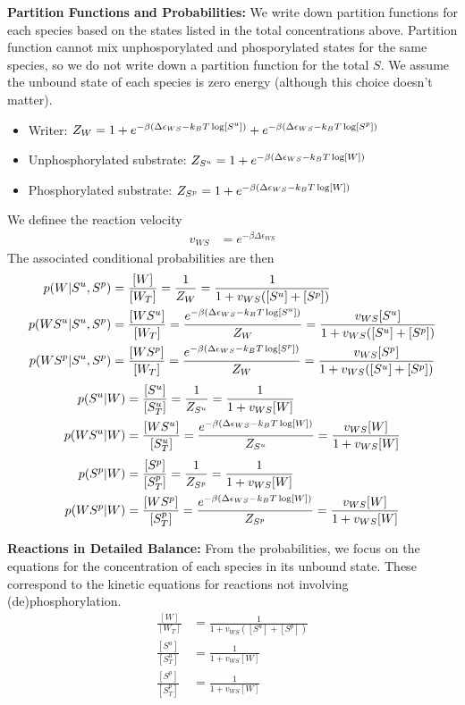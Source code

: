 \documentclass[aps,onecolumn,superscriptaddress,notitlepage]{revtex4-1}
\begin{document}
\textbf{Partition Functions and Probabilities:}
We write down partition functions for each species based on the states listed in the total concentrations above. 
Partition function cannot mix unphosporylated and phosporylated states for the same species, 
so we do not write down a partition function for the total $S$.
We assume the unbound state of each species is zero energy (although this choice doesn't matter).
\begin{itemize}
\item Writer: $Z_W = 1 + e^{-\beta\qty(\Delta\epsilon_{WS} -k_BT \log[S^u])} + e^{-\beta(\Delta\epsilon_{WS} -k_BT \log[S^p])}$
\item Unphosphorylated substrate: $Z_{S^u} = 1 + e^{-\beta\qty(\Delta\epsilon_{WS} -k_BT \log[W])}$
\item Phosphorylated substrate: $Z_{S^p} = 1 + e^{-\beta\qty(\Delta\epsilon_{WS} -k_BT \log[W])}$
\end{itemize}
We definee the reaction velocity
\begin{align}
v_{WS} &= e^{-\beta\Delta\epsilon_{WS}}
\end{align}
The associated conditional probabilities are then
\begin{align}
p(W|S^u,S^p) &= \frac{[W]}{[W_T]} = \frac{1}{Z_W} =  \frac{1}{1 + v_{WS}([S^u] +[S^p])}\\
p(WS^u|S^u,S^p) &= \frac{[WS^u]}{[W_T]}  = \frac{e^{-\beta\qty(\Delta\epsilon_{WS} -k_BT \log[S^u])}}{Z_W} =  \frac{v_{WS}[S^u]}{1 + v_{WS}([S^u] +[S^p])}\\
p(WS^p|S^u,S^p) &= \frac{[WS^p]}{[W_T]}  = \frac{e^{-\beta\qty(\Delta\epsilon_{WS} -k_BT \log[S^p])}}{Z_W} =  \frac{v_{WS}[S^p]}{1 + v_{WS}([S^u] +[S^p])}
\end{align}
\begin{align}
p(S^u|W) &= \frac{[S^u]}{[S^u_T]} = \frac{1}{Z_{S^u}} = \frac{1}{1 + v_{WS}[W]}\\
p(WS^u|W) &= \frac{[WS^u]}{[S^u_T]} = \frac{ e^{-\beta\qty(\Delta\epsilon_{WS} -k_BT \log[W])}}{Z_{S^u}} = \frac{v_{WS}[W]}{1 + v_{WS}[W]}
\end{align}
\begin{align}
p(S^p|W) &= \frac{[S^p]}{[S^p_T]} = \frac{1}{Z_{S^p}} = \frac{1}{1 + v_{WS}[W]}\\
p(WS^p|W) &= \frac{[WS^p]}{[S^p_T]} = \frac{ e^{-\beta\qty(\Delta\epsilon_{WS} -k_BT \log[W])}}{Z_{S^p}} = \frac{v_{WS}[W]}{1 + v_{WS}[W]}
\end{align}


\textbf{Reactions in Detailed Balance:}
From the probabilities, we focus on the equations for the concentration of each species in its unbound state.
These correspond to the kinetic equations for reactions not involving (de)phosphorylation.
\begin{align}
\frac{[W]}{[W_T]} & = \frac{1}{1 + v_{WS}([S^u] +[S^p])}\label{eq:onewayW}\\
\frac{[S^u]}{[S^u_T]} &= \frac{1}{1 + v_{WS}[W]}\label{eq:onewaySu}\\
\frac{[S^p]}{[S^p_T]} &=  \frac{1}{1 + v_{WS}[W]}\label{eq:onewaySp}
\end{align}
\end{document}
